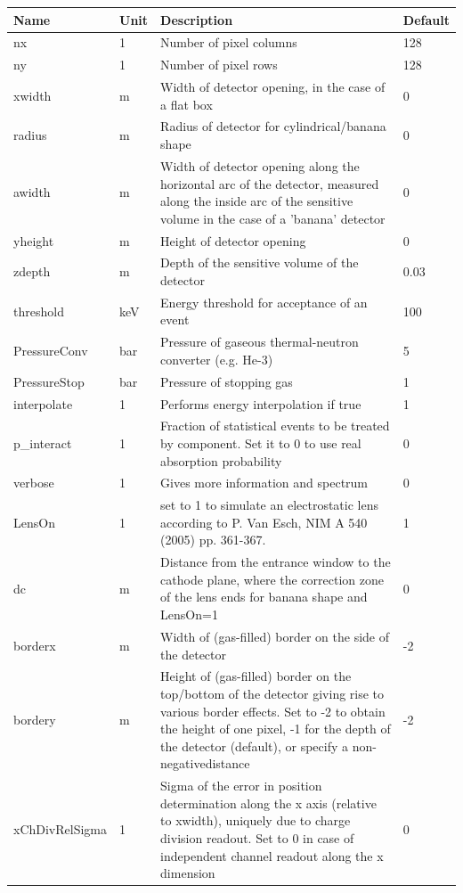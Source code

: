 \begin{longtable}{p{}p{}p{}p{}}
\toprule
\textbf{Name} & \textbf{Unit} & \textbf{Description} & \textbf{Default} \\
\midrule
\endhead
nx & 1 & Number of pixel columns & 128 \\
ny & 1 & Number of pixel rows & 128 \\
xwidth & m & Width of detector opening, in the case of a flat box & 0 \\
radius & m & Radius of detector for cylindrical/banana shape & 0 \\
awidth & m & Width of detector opening along the horizontal arc of the detector, measured along the inside arc of the sensitive volume in the case of a 'banana' detector & 0 \\
yheight & m & Height of detector opening & 0 \\
zdepth & m & Depth of the sensitive volume of the detector & 0.03 \\
threshold & keV & Energy threshold for acceptance of an event & 100 \\
PressureConv & bar & Pressure of gaseous thermal-neutron converter (e.g. He-3) & 5 \\
PressureStop & bar & Pressure of stopping gas & 1 \\
interpolate & 1 & Performs energy interpolation if true & 1 \\
p\_interact & 1 & Fraction of statistical events to be treated by component. Set it to 0 to use real absorption probability & 0 \\
verbose & 1 & Gives more information and spectrum & 0 \\
LensOn & 1 & set to 1 to simulate an electrostatic lens according to P. Van Esch, NIM A 540 (2005) pp. 361-367. & 1 \\
dc & m & Distance from the entrance window to the cathode plane, where the correction zone of the lens ends for banana shape and LensOn=1 & 0 \\
borderx & m & Width of (gas-filled) border on the side of the detector & -2 \\
bordery & m & Height of (gas-filled) border on the top/bottom of the detector giving rise to various border effects. Set to -2 to obtain the height of one pixel, -1 for the depth of the detector (default), or specify a non-negativedistance & -2 \\
xChDivRelSigma & 1 & Sigma of the error in position determination along the x axis (relative to xwidth), uniquely due to charge division readout. Set to 0 in case of independent channel readout along the x dimension & 0 \\

\end{longtable}
